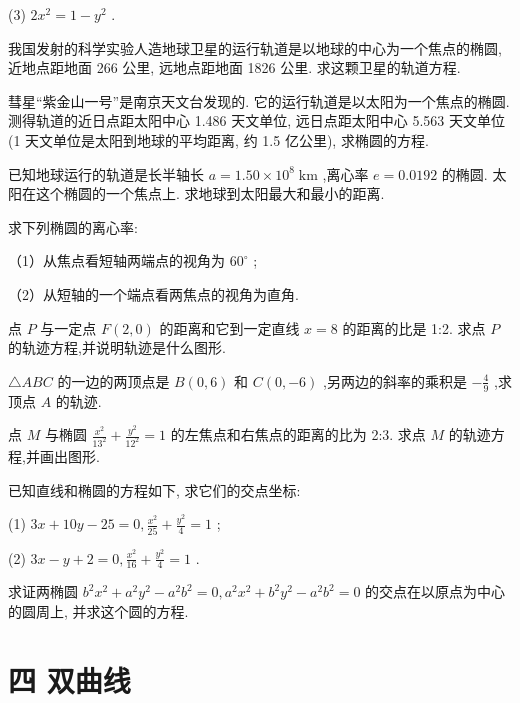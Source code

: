 \documentclass[lang=cn,newtx,10pt,scheme=chinese]{elegantbook}
\begin{document}
\begin{problemset}[习 题 六]
(3) \(2{x}^{2} = 1 - {y}^{2}\) .

\item 我国发射的科学实验人造地球卫星的运行轨道是以地球的中心为一个焦点的椭圆, 近地点距地面 266 公里, 远地点距地面 1826 公里. 求这颗卫星的轨道方程.

\item 彗星“紫金山一号”是南京天文台发现的. 它的运行轨道是以太阳为一个焦点的椭圆. 测得轨道的近日点距太阳中心 1.486 天文单位, 远日点距太阳中心 5.563 天文单位 (1 天文单位是太阳到地球的平均距离, 约 1.5 亿公里), 求椭圆的方程.

\item 已知地球运行的轨道是长半轴长 \(a = {1.50} \times {10}^{8}\mathrm{\;{km}}\) ,离心率 \(e = {0.0192}\) 的椭圆. 太阳在这个椭圆的一个焦点上. 求地球到太阳最大和最小的距离.

\item 求下列椭圆的离心率:

（1）从焦点看短轴两端点的视角为 \({60}^{ \circ }\) ;

（2）从短轴的一个端点看两焦点的视角为直角.

\item 点 \(P\) 与一定点 \(F\left( {2,0}\right)\) 的距离和它到一定直线 \(x = 8\) 的距离的比是 1:2. 求点 \(P\) 的轨迹方程,并说明轨迹是什么图形.

\item \(\bigtriangleup {ABC}\) 的一边的两顶点是 \(B\left( {0,6}\right)\) 和 \(C\left( {0, - 6}\right)\) ,另两边的斜率的乘积是 \(- \frac{4}{9}\) ,求顶点 \(A\) 的轨迹.

\item 点 \(M\) 与椭圆 \(\frac{{x}^{2}}{{13}^{2}} + \frac{{y}^{2}}{{12}^{2}} = 1\) 的左焦点和右焦点的距离的比为 2:3. 求点 \(M\) 的轨迹方程,并画出图形.

\item 已知直线和椭圆的方程如下, 求它们的交点坐标:

(1) \({3x} + {10y} - {25} = 0,\frac{{x}^{2}}{25} + \frac{{y}^{2}}{4} = 1\) ;

(2) \({3x} - y + 2 = 0,\frac{{x}^{2}}{16} + \frac{{y}^{2}}{4} = 1\) .

\item 求证两椭圆 \({b}^{2}{x}^{2} + {a}^{2}{y}^{2} - {a}^{2}{b}^{2} = 0,{a}^{2}{x}^{2} + {b}^{2}{y}^{2} - {a}^{2}{b}^{2} = 0\) 的交点在以原点为中心的圆周上, 并求这个圆的方程.

\end{problemset}

\section*{四 双曲线}
\end{document}
